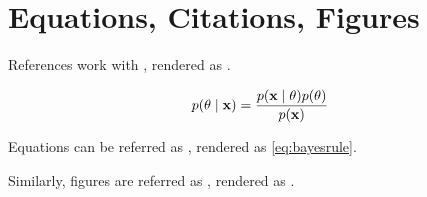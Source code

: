 \documentclass{article}
\begin{document}
\section{Equations, Citations, Figures}

References work with , rendered as \citet{kapoor2020variational}.

\begin{align}
p(\theta \mid {\ensuremath{\boldsymbol{\mathbf{x}}}}) = \frac{p({\boldsymbol{\mathbf{x}}}\mid\theta)p(\theta)}{p({\boldsymbol{\mathbf{x}}})} \label{eq:bayesrule}
\end{align}

Equations can be referred as \vrb{\eqref{eq:bayesrule}}, rendered as \eqref{eq:bayesrule}.

Similarly, figures are referred as , rendered as .

\clearpage

% 

\end{document}
